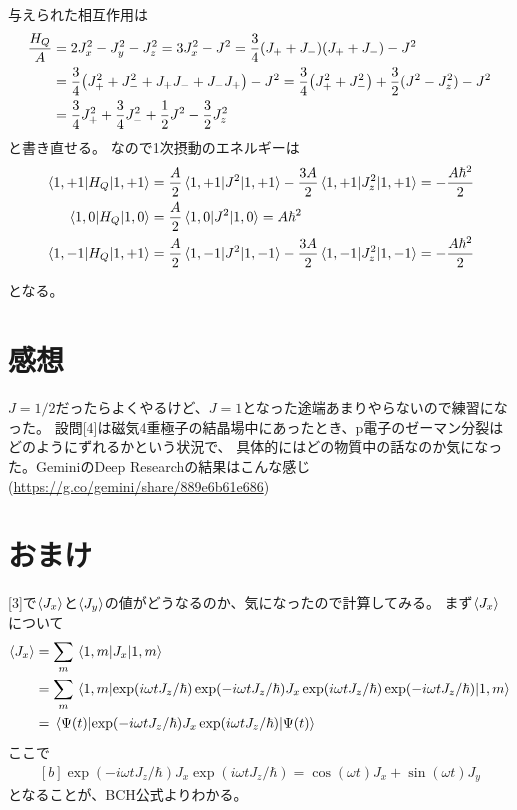 \documentclass[../ap_2012.tex]{subfiles}
\begin{document}
\section{}
与えられた相互作用は
\begin{equation}\begin{aligned}[b]
    \frac{H_Q}{A} &= 2J_x^2 - J_y^2 -J_z^2
    = 3J_x^2-J^2
    = \frac{3}{4}(J_++J_-)(J_++J_-)-J^2\\
    &= \frac{3}{4}\qty(J_+^2+J_-^2+ J_+J_-+J_-J_+)-J^2
    = \frac{3}{4}\qty(J_+^2+J_-^2)+\frac{3}{2}(J^2-J_z^2)-J^2\\
    &=\frac{3}{4}J_+^2+\frac{3}{4}J_-^2+\frac{1}{2}J^2-\frac{3}{2}J_z^2
\end{aligned}\end{equation}
と書き直せる。
なので1次摂動のエネルギーは
\begin{equation}\begin{aligned}[b]
    \mel{1,+1}{H_Q}{1,+1}&=\frac{A}{2}\mel{1,+1}{J^2}{1,+1}-\frac{3A}{2}\mel{1,+1}{J_z^2}{1,+1}=-\frac{A\hbar^2}{2}\\
    \mel{1,0}{H_Q}{1,0}&=\frac{A}{2}\mel{1,0}{J^2}{1,0}=A\hbar^2\\
    \mel{1,-1}{H_Q}{1,+1}&=\frac{A}{2}\mel{1,-1}{J^2}{1,-1}-\frac{3A}{2}\mel{1,-1}{J_z^2}{1,-1}=-\frac{A\hbar^2}{2}\\
\end{aligned}\end{equation}
となる。

\section*{感想}
\(J=1/2\)だったらよくやるけど、\(J=1\)となった途端あまりやらないので練習になった。
設問[4]は磁気4重極子の結晶場中にあったとき、p電子のゼーマン分裂はどのようにずれるかという状況で、
具体的にはどの物質中の話なのか気になった。GeminiのDeep Researchの結果はこんな感じ(\url{https://g.co/gemini/share/889e6b61e686})

\section*{おまけ}
[3]で\(\ev{J_x}\)と\(\ev{J_y}\)の値がどうなるのか、気になったので計算してみる。
まず\(\ev{J_x}\)について
\begin{equation*}\begin{aligned}[b]
    \ev{J_x} &= \sum_m \mel{1,m}{J_x}{1,m}\\
    &=\sum_m \mel{1,m}{\exp(i\omega t J_z/\hbar)\exp(-i\omega t J_z/\hbar)J_x\exp(i\omega t J_z/\hbar)\exp(-i\omega t J_z/\hbar)}{1,m}\\
    &= \mel{\Psi(t)}{\exp(-i\omega t J_z/\hbar)J_x\exp(i\omega t J_z/\hbar)}{\Psi(t)}
\end{aligned}\end{equation*}
ここで
\begin{equation*}\begin{aligned}[b]
    \exp(-i\omega t J_z/\hbar)J_x\exp(i\omega t J_z/\hbar)
    = \cos(\omega t)J_x+ \sin(\omega t)J_y
\end{aligned}\end{equation*}
となることが、BCH公式よりわかる。
\end{document}
